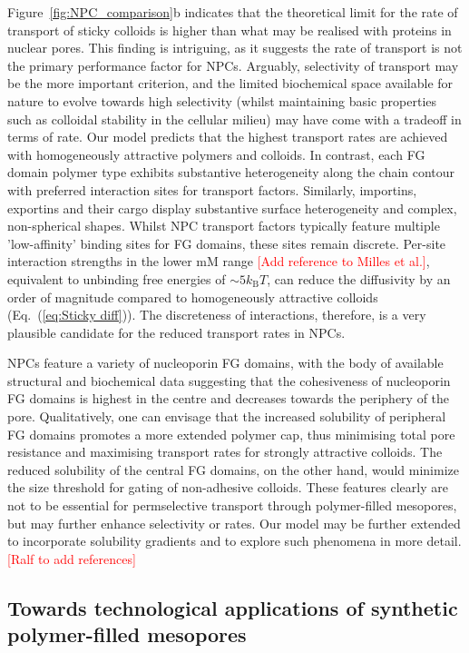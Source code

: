 \documentclass[12pt, a4paper]{article}
\newcommand\todo[1]{\textcolor{red}{#1}}
\begin{document}
Figure~\ref{fig:NPC_comparison}b indicates that the theoretical limit for the rate of transport of sticky colloids is higher than what may be realised with proteins in nuclear pores.
This finding is intriguing, as it suggests the rate of transport is not the primary performance factor for NPCs.
Arguably, selectivity of transport may be the more important criterion, and the limited biochemical space available for nature to evolve towards high selectivity (whilst maintaining basic properties such as colloidal stability in the cellular milieu) may have come with a tradeoff in terms of rate.
Our model predicts that the highest transport rates are achieved with homogeneously attractive polymers and colloids.
In contrast, each FG domain polymer type exhibits substantive heterogeneity along the chain contour with preferred interaction sites for transport factors.
Similarly, importins, exportins and their cargo display substantive surface heterogeneity and complex, non-spherical shapes.
Whilst NPC transport factors typically feature multiple 'low-affinity' binding sites for FG domains, these sites remain discrete.
Per-site interaction strengths in the lower mM range \cite{Hough2015} \todo{[Add reference to Milles et al.]}, equivalent to unbinding free energies of $\sim 5 k_\text{B}T$, can reduce the diffusivity by an order of magnitude compared to homogeneously attractive colloids  (Eq.~(\ref{eq:Sticky diff})).
The discreteness of interactions, therefore, is a very plausible candidate for the reduced transport rates in NPCs. 

NPCs feature a variety of nucleoporin FG domains, with the body of available structural and biochemical data suggesting that the cohesiveness of nucleoporin FG domains is highest in the centre and decreases towards the periphery of the pore.
Qualitatively, one can envisage that the increased solubility of peripheral FG domains promotes a more extended polymer cap, thus minimising total pore resistance and maximising transport rates for strongly attractive colloids.
The reduced solubility of the central FG domains, on the other hand, would minimize the size threshold for gating of non-adhesive colloids.
These features clearly are not to be essential for permselective transport through polymer-filled mesopores, but may further enhance selectivity or rates. Our model may be further extended to incorporate solubility gradients and to explore such phenomena in more detail.
\todo{[Ralf to add references]}

\subsection{Towards technological applications of synthetic polymer-filled mesopores}
\end{document}
